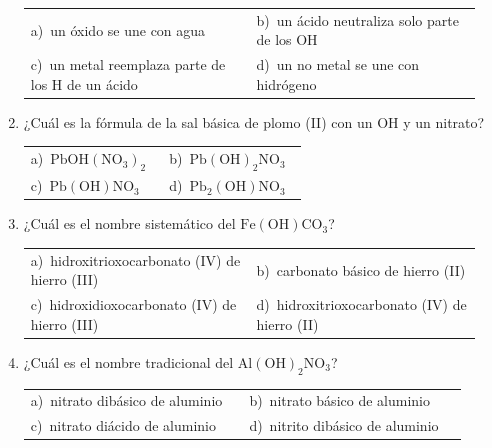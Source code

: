 \documentclass[11pt,a4paper]{article}
\begin{document}
\begin{enumerate}[label=\textbf{\arabic*.},leftmargin=*,itemsep=11pt,topsep=0pt]
\begin{minipage}[t]{\linewidth}
\vspace{5pt}
\begin{tabular}{@{}p{0.47\linewidth}p{0.47\linewidth}@{}}
a)~un óxido se une con agua & b)~un ácido neutraliza solo parte de los OH \\
c)~un metal reemplaza parte de los H de un ácido & d)~un no metal se une con hidrógeno \\
\end{tabular}
\end{minipage}

\item \begin{minipage}[t]{\linewidth}
¿Cuál es la fórmula de la sal básica de plomo (II) con un OH y un nitrato?

\vspace{5pt}
\begin{tabular}{@{}p{0.47\linewidth}p{0.47\linewidth}@{}}
a)~$\mathrm{PbOH(NO_{3})_{2}}$ & b)~$\mathrm{Pb(OH)_{2}NO_{3}}$ \\
c)~$\mathrm{Pb(OH)NO_{3}}$ & d)~$\mathrm{Pb_{2}(OH)NO_{3}}$ \\
\end{tabular}
\end{minipage}

\item \begin{minipage}[t]{\linewidth}
¿Cuál es el nombre sistemático del $\mathrm{Fe(OH)CO_{3}}$?

\vspace{5pt}
\begin{tabular}{@{}p{0.47\linewidth}p{0.47\linewidth}@{}}
a)~hidroxitrioxocarbonato (IV) de hierro (III) & b)~carbonato básico de hierro (II) \\
c)~hidroxidioxocarbonato (IV) de hierro (III) & d)~hidroxitrioxocarbonato (IV) de hierro (II) \\
\end{tabular}
\end{minipage}

\item \begin{minipage}[t]{\linewidth}
¿Cuál es el nombre tradicional del $\mathrm{Al(OH)_{2}NO_{3}}$?

\vspace{5pt}
\begin{tabular}{@{}p{0.47\linewidth}p{0.47\linewidth}@{}}
a)~nitrato dibásico de aluminio & b)~nitrato básico de aluminio \\
c)~nitrato diácido de aluminio & d)~nitrito dibásico de aluminio \\
\end{tabular}
\end{minipage}


\end{enumerate}
\end{document}

